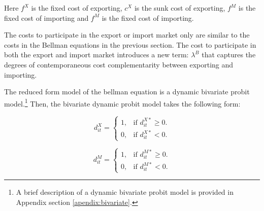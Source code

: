 \documentclass[12pt]{article}
\begin{document}
Here $f^{X}$ is the fixed cost of exporting, $c^{X}$ is the sunk cost
of exporting, $f^{M}$ is the fixed cost of importing and $f^{M}$ is the
fixed cost of importing.

The costs to participate in the export or import market only are
similar to the costs in the Bellman equations in the previous
section. The cost to participate in both the export and import market
introduces a new term: $\lambda^B$  that captures the degrees of
contemporaneous cost complementarity between exporting and importing. 

The reduced form model of the bellman equation is a dynamic bivariate
probit model.\footnote{A
  brief description of a dynamic bivariate probit model is
  provided in Appendix section \ref{apendix:bivariate}.}  Then, the bivariate dynamic probit model  takes the following form:

\begin{equation}
  d_{it}^{X}=\begin{cases}
   1 , & \text{if $d_{it}^{X*}\geq 0$}.\\
   0 , & \text{if $d_{it}^{X*}<  0$}.
  \end{cases}
\end{equation}

\begin{equation}
  d_{it}^{M}=\begin{cases}
   1 , & \text{if $d_{it}^{M*} \geq  0$}.\\
   0 , & \text{if $d_{it}^{M*}<  0$}.
  \end{cases}
\end{equation}
\end{document}
